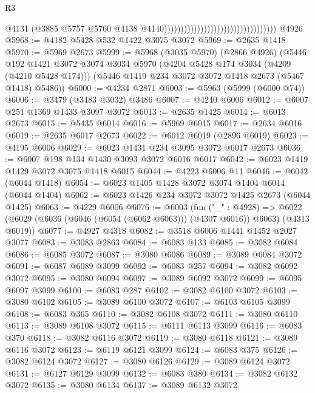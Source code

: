 \begin{lexlean}{R3}
\begin{coremodule}
                                                                      @4131
                                                                      (@3885
                                                                        @5757
                                                                        @5760
                                                                        @4138
                                                                        @4140))))))))))))))))))))))))))))))))))
    @4926
@5968 := @4182 @5428 @532 @1422 @3075 @3072
@5969 := @2635 @1418
@5970 := @5969 @2673
@5999 := @5968
    (@3035 @5970)
    (@2866 @4926)
    (@5446
      @192
      @1421
      @3072
      @3074
      @3034
      @5970
      (@4204 @5428 @174 @3034 (@4209 (@4210 @5428 @174)))
      (@5446 @1419 @234 @3072 @3072 @1418 @2673 (@5467 @1418) @5486))
@6000 := @4234 @2871
@6003 := @5963 (@5999 (@6000 @74))
@6006 := @3479 (@3483 @3032) @3486
@6007 := @4240 @6006
@6012 := @6007 @251 @1369 @1433 @3097 @3072
@6013 := @2635 @1425
@6014 := @6013 @2673
@6015 := @5435 @6014
@6016 := @5969 @6015
@6017 := @2634 @6016
@6019 := @2635 @6017 @2673
@6022 := @6012 @6019 (@2896 @6019)
@6023 := @4195 @6006
@6029 := @6023 @1431 @234 @3095 @3072 @6017 @2673
@6036 := @6007 @198 @134 @1430 @3093 @3072 @6016 @6017
@6042 := @6023 @1419 @1429 @3072 @3075 @1418 @6015
@6044 := @4223 @6006 @11
@6046 := @6042 (@6044 @1418)
@6054 := @6023 @1405 @1428 @3072 @3074 @1404 @6014 (@6044 @1404)
@6062 := @6023 @1426 @234 @3072 @3072 @1425 @2673 (@6044 @1425)
@6063 := @4229 @6006
@6076 := @6003
    (fun ("_" : @4928) =>
    @6022 (@6029 (@6036 (@6046 (@6054 (@6062 @6063))) (@4307 @6016)) @6063) (@4313 @6019))
@6077 := @4927 @4318
@6082 := @3518 @6006 @1441 @1452 @2027 @3077
@6083 := @3083 @2863
@6084 := @6083 @133
@6085 := @3082 @6084
@6086 := @6085 @3072
@6087 := @3080 @6086
@6089 := @3089 @6084 @3072
@6091 := @6087 @6089 @3099
@6092 := @6083 @257
@6094 := @3082 @6092 @3072
@6095 := @3080 @6094
@6097 := @3089 @6092 @3072
@6099 := @6095 @6097 @3099
@6100 := @6083 @287
@6102 := @3082 @6100 @3072
@6103 := @3080 @6102
@6105 := @3089 @6100 @3072
@6107 := @6103 @6105 @3099
@6108 := @6083 @365
@6110 := @3082 @6108 @3072
@6111 := @3080 @6110
@6113 := @3089 @6108 @3072
@6115 := @6111 @6113 @3099
@6116 := @6083 @370
@6118 := @3082 @6116 @3072
@6119 := @3080 @6118
@6121 := @3089 @6116 @3072
@6123 := @6119 @6121 @3099
@6124 := @6083 @375
@6126 := @3082 @6124 @3072
@6127 := @3080 @6126
@6129 := @3089 @6124 @3072
@6131 := @6127 @6129 @3099
@6132 := @6083 @380
@6134 := @3082 @6132 @3072
@6135 := @3080 @6134
@6137 := @3089 @6132 @3072

\end{coremodule}
\end{lexlean}
